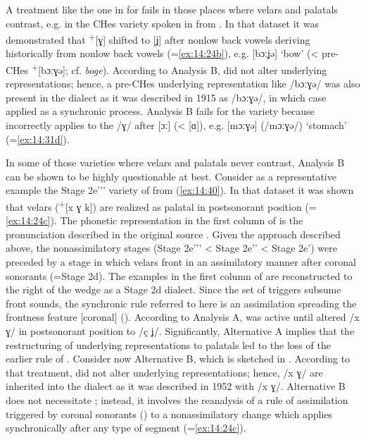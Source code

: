 A treatment like the one in  for  fails in those places where velars and palatals contrast, e.g. in the CHes variety spoken in  \citep{Kroh1915} from . In that dataset it was demonstrated that  \textsuperscript{+}[ɣ] shifted to [ʝ] after nonlow back vowels deriving historically from nonlow back vowels (=\ref{ex:14:24b}), e.g. [bɔːʝə] ‘bow’ (< pre-CHes \textsuperscript{+}[bɔːɣə]; cf.  \textit{boge}). According to Analysis B,  did not alter underlying representations; hence, a pre-CHes underlying representation like /bɔːɣə/ was also present in the dialect as it was described in 1915 as /bɔːɣə/, in which case  applied as a synchronic process. Analysis B fails for the  variety because  incorrectly applies to the /ɣ/ after [ɔː] (< [ɑ]), e.g. [mɔːɣə] (/mɔːɣə/) ‘stomach’ (=\ref{ex:14:31d}).

In some of those varieties where velars and palatals never contrast, Analysis B can be shown to be highly questionable at best. Consider as a representative example the Stage 2e'{}'{}' variety of  from (\ref{ex:14:40}). In that dataset it was shown that  velars (\textsuperscript{+}[x ɣ k]) are realized as palatal in postsonorant position (=\ref{ex:14:24c}). The phonetic representation in the first column of  is the pronunciation described in the original source \citep{Bruch1952}. Given the  approach described above, the nonassimilatory stages (Stage 2e'{}'{}' < Stage 2e'{}' < Stage 2e') were preceded by a stage in which velars front in an assimilatory manner after coronal sonorants (=Stage 2d). The examples in the first column of  are reconstructed to the right of the wedge as a Stage 2d dialect. Since the set of triggers subsume front sounds, the synchronic rule referred to here is an assimilation spreading the frontness feature [coronal] (). According to Analysis A,  was active until  altered /x ɣ/ in postsonorant position to /ç ʝ/. Significantly, Alternative A implies that the restructuring of underlying representations to palatals led to the loss of the earlier rule of . Consider now Alternative B, which is sketched in . According to that treatment,  did not alter underlying representations; hence, /x ɣ/ are inherited into the dialect as it was described in 1952 with /x ɣ/. Alternative B does not necessitate ; instead, it involves the reanalysis of a rule of assimilation triggered by coronal sonorants () to a nonassimilatory change which applies synchronically after any type of segment (=\ref{ex:14:24c}).

